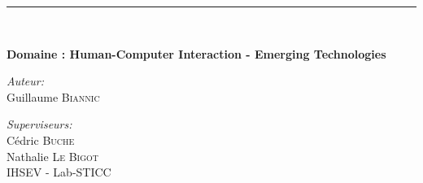 \documentclass[11pt]{article}
\newcommand{\HRule}{\rule{\linewidth}{0.5mm}}
\begin{document}
\begin{titlepage}
\begin{center}
\HRule \\[1.5cm]
\begin{flushleft}
\textbf{Domaine : Human-Computer Interaction - Emerging Technologies}
\end{flushleft}

%
\begin{minipage}{0.4\textwidth}
\begin{flushleft} \large
\emph{Auteur:}\\
Guillaume  \textsc{Biannic}
\end{flushleft}
\end{minipage}
\begin{minipage}{0.5\textwidth}
\begin{flushright} \large
\emph{Superviseurs:} \\
%
Cédric \textsc{Buche} \\ %
Nathalie \textsc{Le Bigot} \\ %
IHSEV - Lab-STICC
\end{flushright}
\end{minipage}


\end{center}
\end{titlepage}
\end{document}
